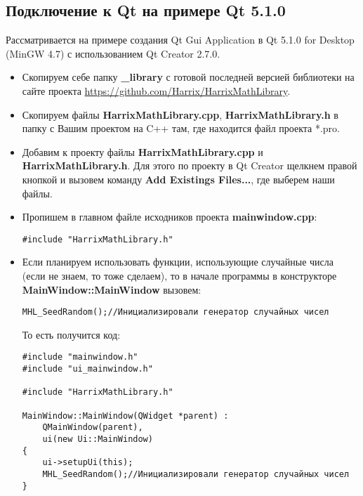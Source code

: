 \subsection{Подключение к Qt на примере Qt 5.1.0}

Рассматривается на примере создания Qt Gui Application в Qt 5.1.0 for Desktop (MinGW 4.7) с использованием Qt Creator 2.7.0.

\begin{itemize}
\item Скопируем себе папку \textbf{\_library} с готовой последней версией библиотеки на сайте проекта \href{https://github.com/Harrix/HarrixMathLibrary}{https://github.com/Harrix/HarrixMathLibrary}.

\item Скопируем файлы \textbf{HarrixMathLibrary.cpp}, \textbf{HarrixMathLibrary.h} в папку с Вашим проектом на C++ там, где находится файл проекта *.pro.

\item Добавим к проекту файлы \textbf{HarrixMathLibrary.cpp} и \textbf{HarrixMathLibrary.h}. Для этого по проекту в Qt Creator щелкнем правой кнопкой и вызовем команду \textbf{Add Existings Files...}, где выберем наши файлы.

\item Пропишем в главном файле исходников проекта \textbf{mainwindow.cpp}:
\begin{lstlisting}[label=install_01_qt,caption=Подключение библиотеки]
#include "HarrixMathLibrary.h"
\end{lstlisting}

\item Если планируем использовать функции, использующие случайные числа (если не знаем, то тоже сделаем), то в начале программы в конструкторе \textbf{MainWindow::MainWindow} вызовем:
\begin{lstlisting}[label=install_02_qt,caption=Инициализация генератора случайных чисел]
MHL_SeedRandom();//Инициализировали генератор случайных чисел
\end{lstlisting}

То есть получится код:
\begin{lstlisting}[label=install_03_qt,caption=Пример файла mainwindow.cpp с подключенной библиотекой]
#include "mainwindow.h"
#include "ui_mainwindow.h"

#include "HarrixMathLibrary.h"

MainWindow::MainWindow(QWidget *parent) :
    QMainWindow(parent),
    ui(new Ui::MainWindow)
{
    ui->setupUi(this);
    MHL_SeedRandom();//Инициализировали генератор случайных чисел    
}


\end{lstlisting}
\end{itemize}
